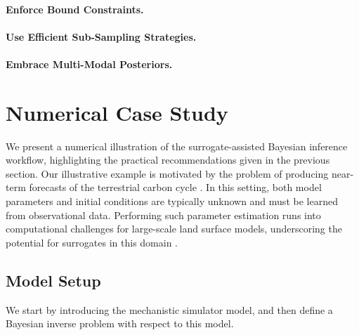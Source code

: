 \documentclass[12pt]{article}
\begin{document}
\paragraph{Enforce Bound Constraints.}
\paragraph{Use Efficient Sub-Sampling Strategies.}
\paragraph{Embrace Multi-Modal Posteriors.}

\section{Numerical Case Study} \label{sec:case-study}
We present a numerical illustration of the surrogate-assisted Bayesian inference workflow, highlighting
the practical recommendations given in the previous section.
Our illustrative example is motivated by the problem of producing near-term forecasts of the 
terrestrial carbon cycle \citep{nearTermForecasts,FerEmulation}. In this setting, both model parameters 
and initial conditions are typically unknown and must be learned from observational data. Performing 
such parameter estimation runs into computational challenges for large-scale land surface models, 
underscoring the potential for surrogates in this domain \citep{paramLSM}.  

\subsection{Model Setup}
We start by introducing the mechanistic simulator model, and then define a Bayesian inverse 
problem with respect to this model.
\end{document}
